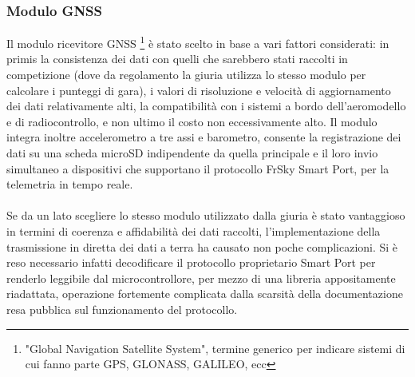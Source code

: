 \documentclass[12pt]{article}
\begin{document}
\subsubsection{Modulo GNSS}
Il modulo ricevitore GNSS \footnote{"Global Navigation Satellite System", termine generico per indicare sistemi di cui fanno parte GPS, GLONASS, GALILEO, ecc} è stato scelto in base a vari fattori considerati: in primis la consistenza dei dati con quelli che sarebbero stati raccolti in competizione (dove da regolamento la giuria utilizza lo stesso modulo per calcolare i punteggi di gara), i valori di risoluzione e velocità di aggiornamento dei dati relativamente alti, la compatibilità con i sistemi a bordo dell'aeromodello e di radiocontrollo, e non ultimo il costo non eccessivamente alto. Il modulo integra inoltre accelerometro a tre assi e barometro, consente la registrazione dei dati su una scheda microSD indipendente da quella principale e il loro invio simultaneo a dispositivi che supportano il protocollo FrSky Smart Port, per la telemetria in tempo reale.
\\\\
Se da un lato scegliere lo stesso modulo utilizzato dalla giuria è stato vantaggioso in termini di coerenza e affidabilità dei dati raccolti, l'implementazione della trasmissione in diretta dei dati a terra ha causato non poche complicazioni. Si è reso necessario infatti decodificare il protocollo proprietario Smart Port per renderlo leggibile dal microcontrollore, per mezzo di una libreria appositamente riadattata, operazione fortemente complicata dalla scarsità della documentazione resa pubblica sul funzionamento del protocollo.
\end{document}
